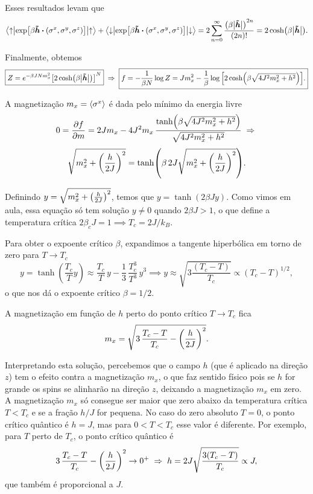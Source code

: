 \documentclass[a4paper,10pt]{article}
\newcommand{\hhh}{\bm{\tilde{h}}}
\begin{document}
Esses resultados levam que
$$
\ev**{\exp[\beta \hhh \vdot (\s^x, \s^y, \s^z)]}{\up} +
\ev**{\exp[\beta \hhh \vdot (\s^x, \s^y, \s^z)]}{\down} =
2 \sum_{n=0}^{\infty} \frac{\qty(\beta \abs{\hhh})^{2n}}{(2n)!} = 2 \cosh(\beta\abs{\hhh}).
$$

Finalmente, obtemos
$$
\boxed{ Z = e^{-\beta J N m_x^2} \qty[2\cosh(\beta \abs{\hhh})]^N } \implies
\boxed{ f = -\frac{1}{\beta N} \log Z =
J m_x^2 - \frac{1}{\beta} \log\qty[2\cosh(\beta\sqrt{4J^2 m_x^2 + h^2})]. }
$$

\n

A magnetização $m_x = \ev{\s^x}$ é dada pelo mínimo da energia livre
$$
0 = \pdv{f}{m} =
2 J m_x - 4 J^2m_x \, \frac{\tanh(\beta\sqrt{4J^2 m_x^2 + h^2})}{\sqrt{4J^2 m_x^2 + h^2}} \; \Rightarrow \;
$$
$$
\sqrt{m_x^2 + \qty(\frac{h}{2J})^2} = \tanh(\beta \, 2J \sqrt{m_x^2 + \qty(\frac{h}{2J})^2}).
$$

Definindo $y = \sqrt{m_x^2 + \qty(\frac{h}{2J})^2}$, temos que $y = \tanh(2\beta J y)$. Como vimos em aula, essa equação só tem solução $y \neq 0$ quando $2 \beta J > 1$, o que define a temperatura crítica $2 \beta_c J = 1 \implies T_c = 2J / k_B$.

\n

Para obter o expoente crítico $\beta$, expandimos a tangente hiperbólica em torno de zero para $T \to T_c$
$$
y = \tanh(\frac{T_c}{T} y) \approx \frac{T_c}{T} \, y - \frac{1}{3} \, \frac{T_c^3}{T^3} \, y^3 \implies
y \approx \sqrt{3 \frac{(T_c-T)}{T_c}} \propto (T_c - T)^{1/2},
$$
o que nos dá o expoente crítico $\beta = 1/2$.

\n

A magnetização em função de $h$ perto do ponto crítico $T \to T_c$ fica
$$
m_x = \sqrt{3 \, \frac{T_c - T}{T_c} - \qty(\frac{h}{2J})^2}.
$$

\n

Interpretando esta solução, percebemos que o campo $h$ (que é aplicado na direção $z$) tem o efeito contra a magnetização $m_x$, o que faz sentido físico pois se $h$ for grande os spins se alinharão na direção $z$, deixando a magnetização $m_x$ em zero. A magnetização $m_x$ só consegue ser maior que zero abaixo da temperatura crítica $T < T_c$ e se a fração $h/J$ for pequena. No caso do zero absoluto $T = 0$, o ponto crítico quântico é $h = J$, mas para $0 < T < T_c$ esse valor é diferente. Por exemplo, para $T$ perto de $T_c$, o ponto crítico quântico é
$$
3 \, \frac{T_c - T}{T_c} - \qty(\frac{h}{2J})^2 \to 0^+ \; \Rightarrow \;
h = 2J \sqrt{\frac{3(T_c - T)}{T_c} } \propto J,
$$
que também é proporcional a $J$.







%
%
\end{document}
